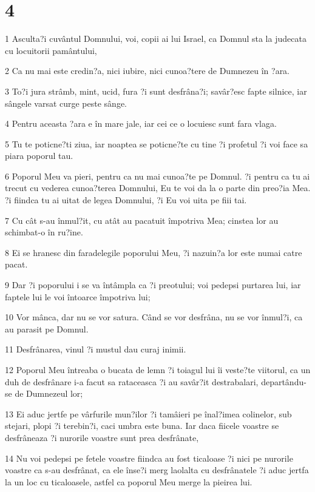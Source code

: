 \chapter{4}

\par 1 Asculta?i cuvântul Domnului, voi, copii ai lui Israel, ca Domnul sta la judecata cu locuitorii pamântului,
\par 2 Ca nu mai este credin?a, nici iubire, nici cunoa?tere de Dumnezeu în ?ara.
\par 3 To?i jura strâmb, mint, ucid, fura ?i sunt desfrâna?i; savâr?esc fapte silnice, iar sângele varsat curge peste sânge.
\par 4 Pentru aceasta ?ara e în mare jale, iar cei ce o locuiesc sunt fara vlaga.
\par 5 Tu te poticne?ti ziua, iar noaptea se poticne?te cu tine ?i profetul ?i voi face sa piara poporul tau.
\par 6 Poporul Meu va pieri, pentru ca nu mai cunoa?te pe Domnul. ?i pentru ca tu ai trecut cu vederea cunoa?terea Domnului, Eu te voi da la o parte din preo?ia Mea. ?i fiindca tu ai uitat de legea Domnului, ?i Eu voi uita pe fiii tai.
\par 7 Cu cât s-au înmul?it, cu atât au pacatuit împotriva Mea; cinstea lor au schimbat-o în ru?ine.
\par 8 Ei se hranesc din faradelegile poporului Meu, ?i nazuin?a lor este numai catre pacat.
\par 9 Dar ?i poporului i se va întâmpla ca ?i preotului; voi pedepsi purtarea lui, iar faptele lui le voi întoarce împotriva lui;
\par 10 Vor mânca, dar nu se vor satura. Când se vor desfrâna, nu se vor înmul?i, ca au parasit pe Domnul.
\par 11 Desfrânarea, vinul ?i mustul dau curaj inimii.
\par 12 Poporul Meu întreaba o bucata de lemn ?i toiagul lui îi veste?te viitorul, ca un duh de desfrânare i-a facut sa rataceasca ?i au savâr?it destrabalari, departându-se de Dumnezeul lor;
\par 13 Ei aduc jertfe pe vârfurile mun?ilor ?i tamâieri pe înal?imea colinelor, sub stejari, plopi ?i terebin?i, caci umbra este buna. Iar daca fiicele voastre se desfrâneaza ?i nurorile voastre sunt prea desfrânate,
\par 14 Nu voi pedepsi pe fetele voastre fiindca au fost ticaloase ?i nici pe nurorile voastre ca s-au desfrânat, ca ele înse?i merg laolalta cu desfrânatele ?i aduc jertfa la un loc cu ticaloasele, astfel ca poporul Meu merge la pieirea lui.
